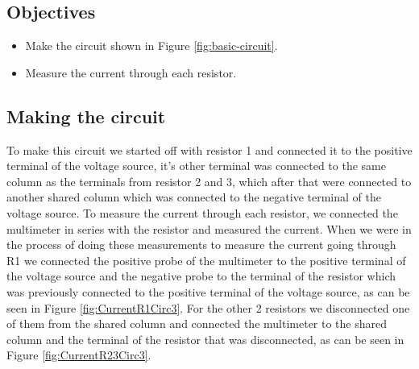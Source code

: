 \documentclass[a4paper, 10pt]{article}
\begin{document}
			\subsection{Objectives}
				\begin{itemize}
					\item Make the circuit shown in Figure \ref{fig:basic-circuit}.
					\item Measure the current through each resistor.
				\end{itemize}

			\subsection{Making the circuit}
				To make this circuit we started off with resistor 1 and connected it to the positive terminal of the voltage source, it's other terminal was connected to
				the same column as the terminals from resistor 2 and 3, which after that were connected to another shared column which was connected to the negative terminal of the voltage source.
				To measure the current through each resistor, we connected the multimeter in series with the resistor and measured the current.
				When we were in the process of doing these measurements to measure the current going through R1 we connected the positive probe of the multimeter to the positive 
				terminal of the voltage source and the negative probe to the terminal of the resistor which was previously connected to the positive terminal of the voltage source, as can be seen in Figure \ref{fig:CurrentR1Circ3}.
				For the other 2 resistors we disconnected one of them from the shared column and connected the multimeter to the shared column and the terminal of the resistor that was disconnected, as can be seen in Figure \ref{fig:CurrentR23Circ3}.
\end{document}
